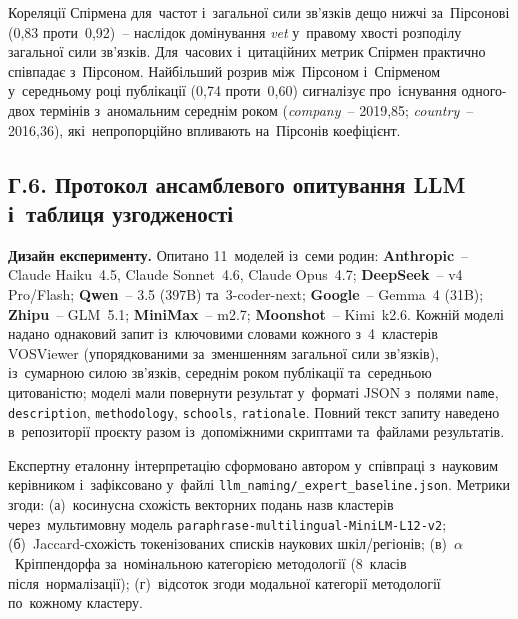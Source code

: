 Кореляції Спірмена для~частот і~загальної сили зв'язків дещо нижчі за~Пірсонові (0,83 проти~0,92)~-- наслідок домінування \textit{vet} у~правому хвості розподілу загальної сили зв'язків. Для~часових і~цитаційних метрик Спірмен практично співпадає з~Пірсоном. Найбільший розрив між~Пірсоном і~Спірменом у~середньому році публікації (0,74 проти~0,60) сигналізує про~існування одного-двох термінів з~аномальним середнім роком (\textit{company}~-- 2019,85; \textit{country}~-- 2016,36), які~непропорційно впливають на~Пірсонів коефіцієнт.

\subsection*{Г.6. Протокол ансамблевого опитування LLM і~таблиця узгодженості}
\label{app:bibliometric-llm}

\textbf{Дизайн експерименту.} Опитано 11~моделей із~семи родин: \textbf{Anthropic}~-- Claude Haiku~4.5, Claude Sonnet~4.6, Claude Opus~4.7; \textbf{DeepSeek}~-- v4 Pro/Flash; \textbf{Qwen}~-- 3.5 (397B) та~3-coder-next; \textbf{Google}~-- Gemma~4 (31B); \textbf{Zhipu}~-- GLM~5.1; \textbf{MiniMax}~-- m2.7; \textbf{Moonshot}~-- Kimi~k2.6. Кожній моделі надано однаковий запит із~ключовими словами кожного з~4~кластерів VOSViewer (упорядкованими за~зменшенням загальної сили зв'язків), із~сумарною силою зв'язків, середнім роком публікації та~середньою цитованістю; моделі мали повернути результат у~форматі JSON з~полями \texttt{name}, \texttt{description}, \texttt{methodology}, \texttt{schools}, \texttt{rationale}. Повний текст запиту наведено в~репозиторії проєкту разом із~допоміжними скриптами та~файлами результатів.

Експертну еталонну інтерпретацію сформовано автором у~співпраці з~науковим керівником і~зафіксовано у~файлі \texttt{llm\_naming/\_expert\_baseline.json}. Метрики згоди: (а)~косинусна схожість векторних подань назв кластерів через~мультимовну модель \texttt{paraphrase-multilingual-MiniLM-L12-v2}; (б)~Jaccard-схожість токенізованих списків наукових шкіл/регіонів; (в)~$\alpha$~Кріппендорфа за~номінальною категорією методології (8~класів після~нормалізації); (г)~відсоток згоди модальної категорії методології по~кожному кластеру.

\begin{table}[htbp]
\centering
\caption{Узгодженість 11~LLM з~експертною інтерпретацією 4~кластерів VOSViewer.}
\label{tab:llm_agreement}
\scriptsize

\end{table}

